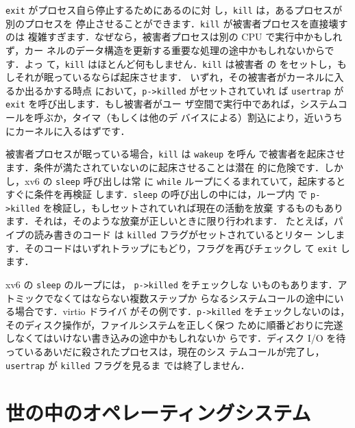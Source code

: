 \texttt{exit} がプロセス自ら停止するためにあるのに対
し，\texttt{kill} 
は，あるプロセスが別のプロセスを
停止させることができます．\texttt{kill} が被害者プロセスを直接壊すのは
複雑すぎます．なぜなら，被害者プロセスは別の CPU で実行中かもしれず，カー
ネルのデータ構造を更新する重要な処理の途中かもしれないからです．よっ
て，\texttt{kill} はほとんど何もしません．\texttt{kill} は被害者
の をセットし，もしそれが眠っているならば起床させます．
いずれ，その被害者がカーネルに入るか出るかする時点
において，\texttt{p->killed} がセットされていれ
ば \texttt{usertrap} が \texttt{exit} を呼び出します．もし被害者がユー
ザ空間で実行中であれば，システムコールを呼ぶか，タイマ（もしくは他のデ
バイスによる）割込により，近いうちにカーネルに入るはずです．

被害者プロセスが眠っている場合，\texttt{kill} は \texttt{wakeup} を呼ん
で被害者を起床させます．条件が満たされていないのに起床させることは潜在
的に危険です．しかし，xv6 の \texttt{sleep} 呼び出しは常
に \texttt{while} ループにくるまれていて，起床するとすぐに条件を再検証
します．\texttt{sleep} の呼び出しの中には，ループ内
で \texttt{p->killed} を検証し，もしセットされていれば現在の活動を放棄
するものもあります．それは，そのような放棄が正しいときに限り行われます．
たとえば，パイプの読み書きのコード
は \texttt{killed} フラグがセットされているとリター
ンします．そのコードはいずれトラップにもどり，フラグを再びチェックし
て \texttt{exit} します．

xv6 の \texttt{sleep} のループには， \texttt{p->killed} をチェックしな
いものもあります．アトミックでなくてはならない複数ステップか
らなるシステムコールの途中にいる場合です．virtio ドライバ
がその例です．\texttt{p->killed}
をチェックしないのは，そのディスク操作が，ファイルシステムを正しく保つ
ために順番どおりに完遂しなくてはいけない書き込みの途中かもしれないか
らです．ディスク I/O を待っているあいだに殺されたプロセスは，現在のシス
テムコールが完了し，\texttt{usertrap} が \texttt{killed} フラグを見るま
では終了しません．

\section{世の中のオペレーティングシステム}

